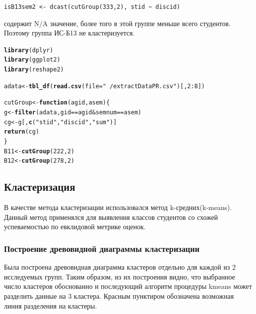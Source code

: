 \documentclass[12pt]{article}\usepackage[]{graphicx}\usepackage[]{color}
\makeatletter
\newcommand{\hlnum}[1]{\textcolor[rgb]{0.686,0.059,0.569}{#1}}%
\newcommand{\hlstr}[1]{\textcolor[rgb]{0.192,0.494,0.8}{#1}}%
\newcommand{\hlopt}[1]{\textcolor[rgb]{0,0,0}{#1}}%
\newcommand{\hlstd}[1]{\textcolor[rgb]{0.345,0.345,0.345}{#1}}%
\newcommand{\hlkwa}[1]{\textcolor[rgb]{0.161,0.373,0.58}{\textbf{#1}}}%
\newcommand{\hlkwb}[1]{\textcolor[rgb]{0.69,0.353,0.396}{#1}}%
\newcommand{\hlkwc}[1]{\textcolor[rgb]{0.333,0.667,0.333}{#1}}%
\newcommand{\hlkwd}[1]{\textcolor[rgb]{0.737,0.353,0.396}{\textbf{#1}}}%
\newenvironment{kframe}{%
 \def\at@end@of@kframe{}%
 \ifinner\ifhmode%
  \def\at@end@of@kframe{\end{minipage}}%
  \begin{minipage}{\columnwidth}%
 \fi\fi%
 \def\FrameCommand##1{\hskip\@totalleftmargin \hskip-\fboxsep
 \colorbox{shadecolor}{##1}\hskip-\fboxsep
     \hskip-\linewidth \hskip-\@totalleftmargin \hskip\columnwidth}%
 \MakeFramed {\advance\hsize-\width
   \@totalleftmargin\z@ \linewidth\hsize
   \@setminipage}}%
 {\par\unskip\endMakeFramed%
 \at@end@of@kframe}
\newenvironment{knitrout}{}{} %
\makeatother
\begin{document}
\begin{verbatim}
isB13sem2 <- dcast(cutGroup(333,2), stid ~ discid)
\end{verbatim}

 содержит N/A значение, более того в этой группе меньше всего студентов. Поэтому группа ИС-Б13 не кластеризуется.\newpage
 
\begin{knitrout}
\color{fgcolor}\begin{kframe}
\begin{alltt}
\hlkwd{library}\hlstd{(dplyr)}
\hlkwd{library}\hlstd{(ggplot2)}
\hlkwd{library}\hlstd{(reshape2)}

\hlstd{adata} \hlkwb{<-} \hlkwd{tbl_df}\hlstd{(}\hlkwd{read.csv}\hlstd{(}\hlkwc{file} \hlstd{=} \hlstr{"~/extractDataPR.csv"}\hlstd{)[ ,}\hlnum{2}\hlopt{:}\hlnum{8}\hlstd{])}

\hlstd{cutGroup} \hlkwb{<-} \hlkwa{function}\hlstd{(}\hlkwc{agid}\hlstd{,} \hlkwc{asem}\hlstd{) \{}
  \hlstd{g} \hlkwb{<-} \hlkwd{filter}\hlstd{(adata, gid} \hlopt{==} \hlstd{agid} \hlopt{&} \hlstd{semnum} \hlopt{==} \hlstd{asem)}
  \hlstd{cg} \hlkwb{<-} \hlstd{g[,}\hlkwd{c}\hlstd{(}\hlstr{"stid"}\hlstd{,} \hlstr{"discid"}\hlstd{,} \hlstr{"sum"}\hlstd{)]}
  \hlkwd{return}\hlstd{(cg)}
\hlstd{\}}
  \hlstd{B11} \hlkwb{<-} \hlkwd{cutGroup}\hlstd{(}\hlnum{222}\hlstd{,}\hlnum{2}\hlstd{)}
  \hlstd{B12} \hlkwb{<-} \hlkwd{cutGroup}\hlstd{(}\hlnum{278}\hlstd{,}\hlnum{2}\hlstd{)}
\end{alltt}
\end{kframe}
\end{knitrout}

\subsection{Кластеризация}
В качестве метода кластеризации использовался метод k-средних(k-means). Данный метод применялся для выявления классов студентов со схожей успеваемостью по евклидовой метрике оценок.

\subsubsection{Построение древовидной диаграммы кластеризации}
Была построена древовидная диаграмма кластеров отдельно для каждой из 2 исследуемых групп. Таким образом, из их построения видно, что выбранное число кластеров обоснованно и последующий алгоритм процедуры kmeans может разделить данные на 3 кластера. Красным пунктиром обозначена возможная линия разделения на кластеры.
\end{document}
